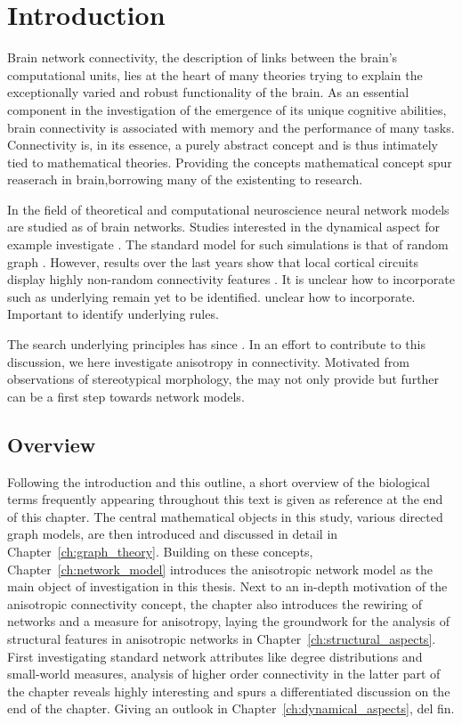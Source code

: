 \chapter{Introduction}\label{ch:Introduction} 

Brain network connectivity, the description of links between the
brain's computational units, lies at the heart of many theories trying
to explain the exceptionally varied and robust functionality of the
brain. As an essential component in the investigation of the emergence
of its unique cognitive abilities, brain connectivity is associated
with memory and the performance of many tasks. Connectivity is, in its
essence, a purely abstract concept and is thus intimately tied to
mathematical theories. Providing the concepts mathematical concept
spur reaserach in brain,borrowing many of the existenting to research.

In the field of theoretical and computational neuroscience neural
network models are studied as of brain networks. Studies interested in
the dynamical aspect for example investigate . The standard model for
such simulations is that of random
graph \parencite{Brunel2000}. However, results over the last years
show that local cortical circuits display highly non-random
connectivity features \parencite{Song2005, Perin2011}. It is unclear
how to incorporate such as underlying remain yet to be identified.
unclear how to incorporate. Important to identify underlying rules.

The search underlying principles has
since \parencite{Klinshov2014}. In an effort to contribute to this
discussion, we here investigate anisotropy in connectivity. Motivated
from observations of stereotypical morphology, the may not only
provide but further can be a first step towards network models.

\section{Overview}\label{sec:all_overview}

Following the introduction and this outline, a short overview of the
biological terms frequently appearing throughout this text is given as
reference at the end of this chapter. The central mathematical objects
in this study, various directed graph models, are then introduced and
discussed in detail in Chapter~\ref{ch:graph_theory}. Building on
these concepts, Chapter~\ref{ch:network_model} introduces the
anisotropic network model as the main object of investigation in this
thesis. Next to an in-depth motivation of the anisotropic connectivity
concept, the chapter also introduces the rewiring of networks and a
measure for anisotropy, laying the groundwork for the analysis of
structural features in anisotropic networks in
Chapter~\ref{ch:structural_aspects}. First investigating standard
network attributes like degree distributions and small-world measures,
analysis of higher order connectivity in the latter part of the
chapter reveals highly interesting and spurs a differentiated
discussion on the end of the chapter. Giving an outlook in
Chapter~\ref{ch:dynamical_aspects}, del fin.



